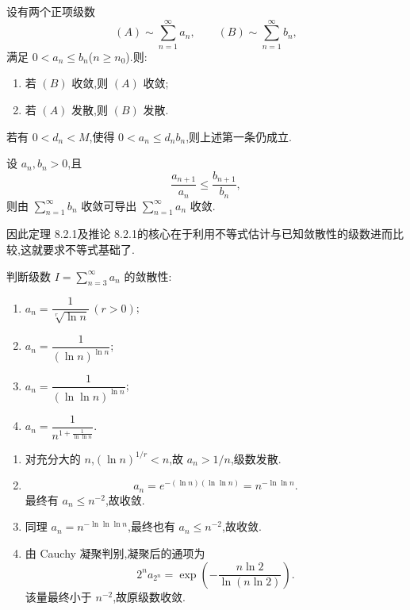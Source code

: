 
\begin{theorem}[\marktwostar]
    设有两个正项级数
    \[
        (A)\sim\sum\limits_{n=1}^{\infty}a_n,
        \qquad
        (B)\sim\sum\limits_{n=1}^{\infty}b_n,
    \]
    满足 $0<a_n\leq b_n$($n\geq n_0$).则:
    \begin{enumerate}
        \item 若 $(B)$ 收敛,则 $(A)$ 收敛;
        \item 若 $(A)$ 发散,则 $(B)$ 发散.
    \end{enumerate}
\end{theorem}

\begin{remark}
    若有 $0<d_n<M$,使得 $0<a_n\leq d_nb_n$,则上述第一条仍成立.
\end{remark}

\begin{corollary}[\marktwostar]
    设 $a_n,b_n>0$,且
    \[
        \dfrac{a_{n+1}}{a_n}\leq\dfrac{b_{n+1}}{b_n},
    \]
    则由 $\displaystyle\sum\limits_{n=1}^{\infty}b_n$ 收敛可导出 $\displaystyle\sum\limits_{n=1}^{\infty}a_n$ 收敛.
\end{corollary}

\begin{remark}
    因此定理 8.2.1及推论 8.2.1的核心在于利用不等式估计与已知敛散性的级数进而比较,这就要求不等式基础了.
\end{remark}

\begin{example}
    判断级数 $\displaystyle I=\sum\limits_{n=3}^{\infty}a_n$ 的敛散性:
    \begin{enumerate}
        \item $\displaystyle a_n=\dfrac{1}{\sqrt[r]{\ln n}}\,(r>0)$;
        \item $\displaystyle a_n=\dfrac{1}{(\ln n)^{\ln n}}$;
        \item $\displaystyle a_n=\dfrac{1}{(\ln\ln n)^{\ln n}}$;
        \item $\displaystyle a_n=\dfrac{1}{n^{1+\frac{1}{\ln\ln n}}}$.
    \end{enumerate}
\end{example}
\exampleblank

\begin{solution}
    \leavevmode
    \begin{enumerate}
        \item 对充分大的 $n$,$(\ln n)^{1/r}<n$,故 $a_n>1/n$,级数发散.
        \item
              \[
                  a_n=e^{-(\ln n)(\ln\ln n)}=n^{-\ln\ln n}.
              \]
              最终有 $a_n\leq n^{-2}$,故收敛.
        \item 同理 $a_n=n^{-\ln\ln\ln n}$,最终也有 $a_n\leq n^{-2}$,故收敛.
        \item 由 Cauchy 凝聚判别,凝聚后的通项为
              \[
                  2^na_{2^n}=\exp\left(-\dfrac{n\ln2}{\ln(n\ln2)}\right).
              \]
              该量最终小于 $n^{-2}$,故原级数收敛.
    \end{enumerate}
\end{solution}

